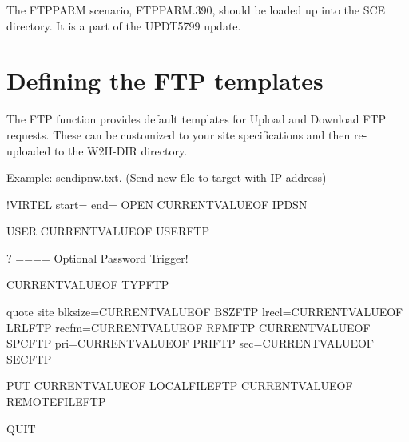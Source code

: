 \documentclass[letterpaper,10pt,english]{sphinxmanual}
\begin{document}

The FTPPARM scenario, FTPPARM.390, should be loaded up into the SCE directory. It is a part of the UPDT5799 update.


\section{Defining the FTP templates}
\label{\detokenize{TN201905:defining-the-ftp-templates}}
The FTP function provides default templates for Upload and Download FTP requests. These can be customized to your site specifications and then re-uploaded to the W2H-DIR directory.

Example: sendipnw.txt. (Send new file to target with IP address)

\begin{sphinxVerbatim}[commandchars=\\\{\}]
\PYGZlt{}!\PYGZhy{}\PYGZhy{}VIRTEL start=\PYGZdq{}\PYGZob{}\PYGZob{}\PYGZob{}\PYGZdq{} end=\PYGZdq{}\PYGZcb{}\PYGZcb{}\PYGZcb{}\PYGZdq{} \PYGZhy{}\PYGZhy{}\PYGZgt{}OPEN \PYGZob{}\PYGZob{}\PYGZob{}CURRENT\PYGZhy{}VALUE\PYGZhy{}OF \PYGZdq{}IPDSN\PYGZdq{}\PYGZcb{}\PYGZcb{}\PYGZcb{}

USER \PYGZob{}\PYGZob{}\PYGZob{}CURRENT\PYGZhy{}VALUE\PYGZhy{}OF \PYGZdq{}USERFTP\PYGZdq{}\PYGZcb{}\PYGZcb{}\PYGZcb{}

?      \PYGZlt{}==== Optional Password Trigger!

\PYGZob{}\PYGZob{}\PYGZob{}CURRENT\PYGZhy{}VALUE\PYGZhy{}OF \PYGZdq{}TYPFTP\PYGZdq{}\PYGZcb{}\PYGZcb{}\PYGZcb{}

quote site blksize=\PYGZob{}\PYGZob{}\PYGZob{}CURRENT\PYGZhy{}VALUE\PYGZhy{}OF \PYGZdq{}BSZFTP\PYGZdq{}\PYGZcb{}\PYGZcb{}\PYGZcb{} lrecl=\PYGZob{}\PYGZob{}\PYGZob{}CURRENT\PYGZhy{}VALUE\PYGZhy{}OF \PYGZdq{}LRLFTP\PYGZdq{}\PYGZcb{}\PYGZcb{}\PYGZcb{} recfm=\PYGZob{}\PYGZob{}\PYGZob{}CURRENT\PYGZhy{}VALUE\PYGZhy{}OF \PYGZdq{}RFMFTP\PYGZdq{}\PYGZcb{}\PYGZcb{}\PYGZcb{} \PYGZob{}\PYGZob{}\PYGZob{}CURRENT\PYGZhy{}VALUE\PYGZhy{}OF \PYGZdq{}SPCFTP\PYGZdq{}\PYGZcb{}\PYGZcb{}\PYGZcb{} pri=\PYGZob{}\PYGZob{}\PYGZob{}CURRENT\PYGZhy{}VALUE\PYGZhy{}OF \PYGZdq{}PRIFTP\PYGZdq{}\PYGZcb{}\PYGZcb{}\PYGZcb{} sec=\PYGZob{}\PYGZob{}\PYGZob{}CURRENT\PYGZhy{}VALUE\PYGZhy{}OF \PYGZdq{}SECFTP\PYGZdq{}\PYGZcb{}\PYGZcb{}\PYGZcb{}

PUT \PYGZob{}\PYGZob{}\PYGZob{}CURRENT\PYGZhy{}VALUE\PYGZhy{}OF \PYGZdq{}LOCALFILEFTP\PYGZdq{}\PYGZcb{}\PYGZcb{}\PYGZcb{} \PYGZob{}\PYGZob{}\PYGZob{}CURRENT\PYGZhy{}VALUE\PYGZhy{}OF \PYGZdq{}REMOTEFILEFTP\PYGZdq{}\PYGZcb{}\PYGZcb{}\PYGZcb{}

QUIT
\end{sphinxVerbatim}
\end{document}
